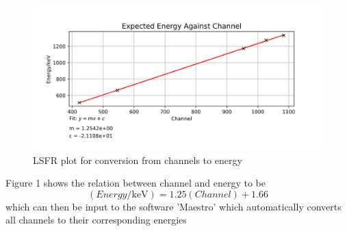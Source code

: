 \documentclass[12pt, a4paper]{article}
\begin{document}
	\begin{figure}[H] \centering
		\includegraphics[scale=0.5]{assets/Calibration.png}
		\caption{LSFR plot for conversion from channels to energy}
	\end{figure}

Figure 1 shows the relation between channel and energy to be
\begin{equation}
	(Energy/\unit{\keV}) = 1.25(Channel)+1.66
\end{equation}
which can then be input to the software 'Maestro' which automatically converts all channels to their corresponding energies
\end{document}
